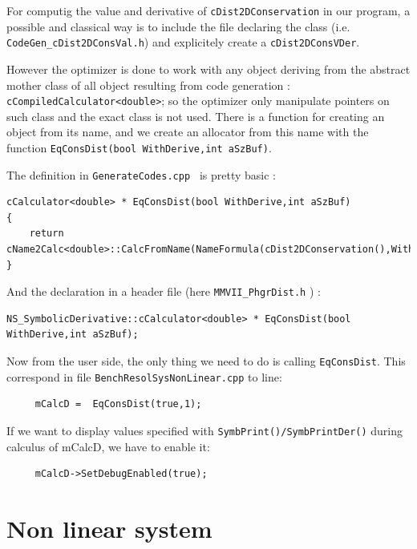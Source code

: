 \label{CreateCalc}

For computig the value and derivative of {\tt cDist2DConservation} in our \CPP program,
 a possible and classical way is to include the file declaring the class
(i.e. {\tt CodeGen\_cDist2DConsVal.h}) and explicitely create a {\tt cDist2DConsVDer}.

However the optimizer is done to work with any object deriving from the abstract mother
class of all object resulting from code generation :  {\tt cCompiledCalculator<double>};
so the optimizer only manipulate pointers on such class and the exact class is not used.
There is a function for creating an object from its name, and we create an allocator
from this name with the function {\tt  EqConsDist(bool WithDerive,int aSzBuf)}.

The definition in {\tt GenerateCodes.cpp }  is pretty basic :

\begin{lstlisting}
cCalculator<double> * EqConsDist(bool WithDerive,int aSzBuf)
{
    return cName2Calc<double>::CalcFromName(NameFormula(cDist2DConservation(),WithDerive),aSzBuf);
}
\end{lstlisting}


And the declaration in a header file (here {\tt MMVII\_PhgrDist.h} ) :


\begin{lstlisting}
NS_SymbolicDerivative::cCalculator<double> * EqConsDist(bool WithDerive,int aSzBuf);
\end{lstlisting}

Now from the user side, the only thing we need to do is calling  {\tt EqConsDist}. This
correspond in file {\tt BenchResolSysNonLinear.cpp}  to line:


\begin{lstlisting}
     mCalcD =  EqConsDist(true,1);
\end{lstlisting}

If we want to display values specified with {\tt SymbPrint()/SymbPrintDer()} during calculus of mCalcD, we have to enable it:

\begin{lstlisting}
     mCalcD->SetDebugEnabled(true);
\end{lstlisting}


\section{Non linear system}

